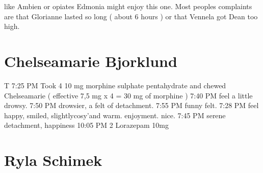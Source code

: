 \documentclass[12pt]{book}
\begin{document}
like Ambien or opiates Edmonia might enjoy this one. Most peoples complaints are that Glorianne lasted so long ( about 6 hours ) or that Vennela got Dean too high.



\chapter{Chelseamarie Bjorklund}

T 7:25 PM Took 4 10 mg morphine sulphate pentahydrate and chewed Chelseamarie ( effective 7,5 mg x 4 = 30 mg of morphine ) 7:40 PM feel a little drowsy. 7:50 PM drowsier, a felt of detachment. 7:55 PM funny felt. 7:28 PM feel happy, smiled, slightlycosy'and warm. enjoyment. nice. 7:45 PM serene detachment, happiness 10:05 PM 2 Lorazepam 10mg






\chapter{Ryla Schimek}
\end{document}
